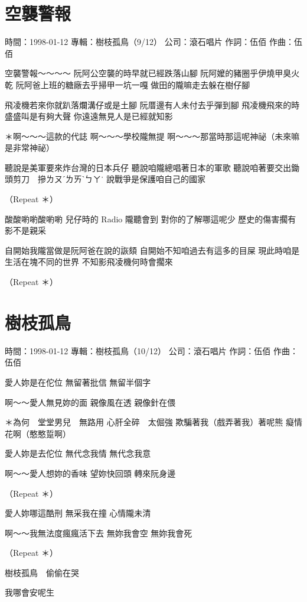 \documentclass[UTF8,a4paper,oneside,twocolumn,12pt]{ctexbook}
\newcommand{\infopair}[2]{\textbullet #1：#2}
\newcommand{\zc}[1][伍佰]{\infopair{作詞}{#1}}
\newcommand{\zq}[1][伍佰]{\infopair{作曲}{#1}}
\newcommand{\zj}[1]{\infopair{專輯}{#1}}
\newcommand{\sj}[1]{\infopair{時間}{#1}}
\newcommand{\gs}[1]{\infopair{公司}{#1}}
\newenvironment{info}{\begin{flushleft}\kaishu
	}
	{\end{flushleft}\normalsize\yahei\par}
\newenvironment{lyric}{
	}
{}
\begin{document}
\section{空襲警報}
\begin{info}
	\sj{1998-01-12}
	\zj{樹枝孤鳥（9/12）}
	\gs{滾石唱片}
	\zc
	\zq
\end{info}
\begin{lyric}
	空襲警報～～～～
	阮阿公空襲的時早就已經跌落山腳
	阮阿嬤的豬圈乎伊燒甲臭火乾
	阮阿爸上班的糖廠去乎掃甲一坑一嘎
	做田的隴嘛走去躲在樹仔腳

	飛凌機若來你就趴落爛溝仔或是土腳
	阮厝邊有人未付去乎彈到腳
	飛凌機飛來的時盛盛叫是有夠大聲
	你遠遠無見人是已經就知影

	＊啊～～～這款的代誌
	啊～～～學校隴無提
	啊～～～那當時那這呢神祕（未來嘛是非常神祕）

	聽說是美軍要來炸台灣的日本兵仔
	聽說咱隴總唱著日本的軍歌
	聽說咱著要交出鋤頭剪刀　摻ㄌㄡˊㄌㄞˋㄅㄚ˙
	說戰爭是保護咱自己的國家

	（Repeat ＊）

	酸酸喲喲酸喲喲
	兒仔時的 Radio 隴聽會到
	對你的了解哪這呢少
	歷史的傷害擱有影不是親采

	自開始我隴當做是阮阿爸在說的詼頦
	自開始不知咱過去有這多的目屎
	現此時咱是生活在塊不同的世界
	不知影飛凌機何時會擱來

	（Repeat ＊）
\end{lyric}

\section{樹枝孤鳥}
\begin{info}
	\sj{1998-01-12}
	\zj{樹枝孤鳥（10/12）}
	\gs{滾石唱片}
	\zc
	\zq
\end{info}
\begin{lyric}
	愛人妳是在佗位
	無留著批信
	無留半個字

	啊～～愛人無見妳的面
	親像風在透
	親像針在偎

	＊為何　堂堂男兒　無路用
	心肝全碎　太倔強
	欺騙著我（戲弄著我）著呢熊
	癡情花啊（憨憨踅啊）

	愛人妳是去佗位
	無代念我情
	無代念我意

	啊～～愛人想妳的香味
	望妳快回頭
	轉來阮身邊

	（Repeat ＊）

	愛人妳哪這酷刑
	無采我在撞
	心情隴未清

	啊～～我無法度瘋瘋活下去
	無妳我會空
	無妳我會死

	（Repeat ＊）

	樹枝孤鳥　偷偷在哭

	我哪會安呢生
\end{lyric}
\end{document}

